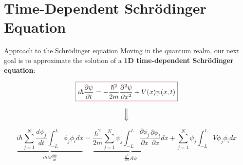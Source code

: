\section{Time-Dependent Schrödinger Equation}

\begin{frame}{Approach to the Schrödinger equation}
    Moving in the quantum realm, our next goal is to approximate the solution of a \textbf{1D time-dependent \textcolor{BrickRed}{Schrödinger equation}}:

    \begin{equation*}
        \fcolorbox{BrickRed}{white}{\text{$\displaystyle i\hbar\frac{\partial\psi}{\partial t}=-\frac{\hbar^2}{2m}\frac{\partial^2\psi}{\partial x^2}+V(x)\psi(x,t)$}}
    \end{equation*}

    \pause

    \begin{equation*}
        \Big\Downarrow
    \end{equation*}

    \small

    \begin{equation*}
        \underbrace{i\hbar\sum_{j=1}^N\frac{d\psi_j}{dt}\int_{-L}^L\phi_j\phi_idx}_{i\hbar M\frac{d\boldsymbol{\psi}}{dt}}=\underbrace{\frac{\hbar^2}{2m}\sum_{j=1}^N\psi_j\int_{-L}^L\frac{\partial\phi_j}{\partial x}\frac{\partial\phi_i}{\partial x}dx}_{\frac{\hbar^2}{2m}A\boldsymbol{\psi}}+\sum_{j=1}^N\psi_j\int_{-L}^LV\phi_j\phi_idx
    \end{equation*}

    \normalsize
\end{frame}

